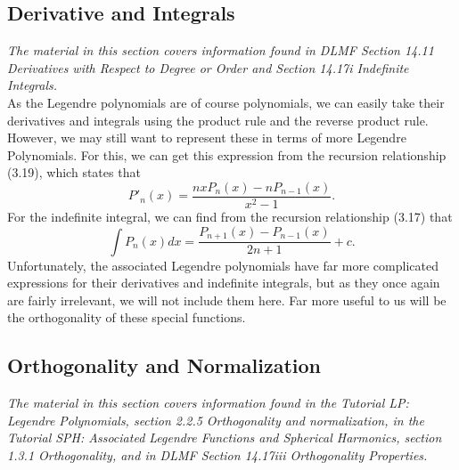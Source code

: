 \documentclass[11pt]{report}
\begin{document}
\subsection{Derivative and Integrals}

\emph{The material in this section covers information found in DLMF Section 14.11 Derivatives with Respect to Degree or Order and Section 14.17i Indefinite Integrals.}\\

As the Legendre polynomials are of course polynomials, we can easily take their derivatives and integrals using the product rule and the reverse product rule. However, we may still want to represent these in terms of more Legendre Polynomials. For this, we can get this expression from the recursion relationship (3.19), which states that
    \begin{equation}
        P'_n(x) = \frac{nxP_n(x)-nP_{n-1}(x)}{x^2-1}.
    \end{equation}
For the indefinite integral, we can find from the recursion relationship (3.17) that
    \begin{equation}
        \int P_n(x)dx = \frac{P_{n+1}(x)-P_{n-1}(x)}{2n+1}+c.
    \end{equation}
Unfortunately, the associated Legendre polynomials have far more complicated expressions for their derivatives and indefinite integrals, but as they once again are fairly irrelevant, we will not include them here. Far more useful to us will be the orthogonality of these special functions.\\


\subsection{Orthogonality and Normalization}

\emph{The material in this section covers information found in the Tutorial LP: Legendre Polynomials, section 2.2.5 Orthogonality and normalization, in the Tutorial SPH: Associated Legendre Functions and Spherical Harmonics, section 1.3.1 Orthogonality, and in DLMF Section 14.17iii Orthogonality Properties.}\\
\end{document}
